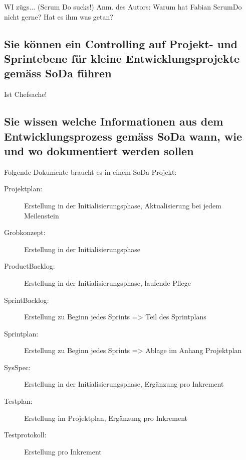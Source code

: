 WI zügs... (Scrum Do sucks!) Anm. des Autors: Warum hat Fabian ScrumDo nicht gerne? Hat es ihm was getan?

\subsection{Sie können ein Controlling auf Projekt- und Sprintebene für kleine Entwicklungsprojekte gemäss SoDa führen}

Ist Chefsache!

\subsection{Sie wissen welche Informationen aus dem Entwicklungsprozess gemäss SoDa wann, wie und wo dokumentiert werden sollen}

Folgende Dokumente braucht es in einem SoDa-Projekt:

\begin{description}
	\item[Projektplan:] Erstellung in der Initialisierungsphase, Aktualisierung bei jedem Meilenstein
	\item[Grobkonzept:] Erstellung in der Initialisierungsphase
	\item[ProductBacklog:] Erstellung in der Initialisierungsphase, laufende Pflege
	\item[SprintBacklog:] Erstellung zu Beginn jedes Sprints => Teil des Sprintplans
	\item[Sprintplan:] Erstellung zu Beginn jedes Sprints => Ablage im Anhang Projektplan
	\item[SysSpec:] Erstellung in der Initialisierungsphase, Ergänzung pro Inkrement
	\item[Testplan:] Erstellung im Projektplan, Ergänzung pro Inkrement
	\item[Testprotokoll:] Erstellung pro Inkrement
\end{description}